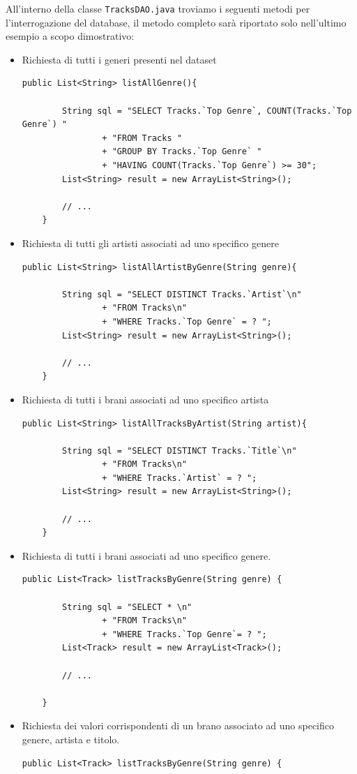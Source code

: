 \documentclass[12pt, a4paper]{article}
\begin{document}
All'interno della classe \texttt{TracksDAO.java} troviamo i seguenti metodi per l'interrogazione del database, il metodo completo sarà riportato solo nell'ultimo esempio a scopo dimostrativo:
\begin{itemize}
\item Richiesta di tutti i generi presenti nel dataset
\begin{lstlisting}
public List<String> listAllGenre(){
		
		String sql = "SELECT Tracks.`Top Genre`, COUNT(Tracks.`Top Genre`) "
				+ "FROM Tracks "
				+ "GROUP BY Tracks.`Top Genre` "
				+ "HAVING COUNT(Tracks.`Top Genre`) >= 30";
		List<String> result = new ArrayList<String>();

		// ...
	}
\end{lstlisting}
\newpage
\item Richiesta di tutti gli artisti associati ad uno specifico genere
\begin{lstlisting}
public List<String> listAllArtistByGenre(String genre){
		
		String sql = "SELECT DISTINCT Tracks.`Artist`\n"
				+ "FROM Tracks\n"
				+ "WHERE Tracks.`Top Genre` = ? ";
		List<String> result = new ArrayList<String>();

		// ...
	}
\end{lstlisting}
\item Richiesta di tutti i brani associati ad uno specifico artista
\begin{lstlisting}
public List<String> listAllTracksByArtist(String artist){
		
		String sql = "SELECT DISTINCT Tracks.`Title`\n"
				+ "FROM Tracks\n"
				+ "WHERE Tracks.`Artist` = ? ";
		List<String> result = new ArrayList<String>();

		// ...
	}
\end{lstlisting}
\item Richiesta di tutti i brani associati ad uno specifico genere.
\begin{lstlisting}
public List<Track> listTracksByGenre(String genre) {
		
		String sql = "SELECT * \n"
				+ "FROM Tracks\n"
				+ "WHERE Tracks.`Top Genre`= ? ";
		List<Track> result = new ArrayList<Track>();

		// ...
		
	}
\end{lstlisting}
\newpage
\item Richiesta dei valori corrispondenti di un brano associato ad uno specifico genere, artista e titolo.
\begin{lstlisting}
public List<Track> listTracksByGenre(String genre) {
		

\end{lstlisting}
\end{itemize}
\end{document}
